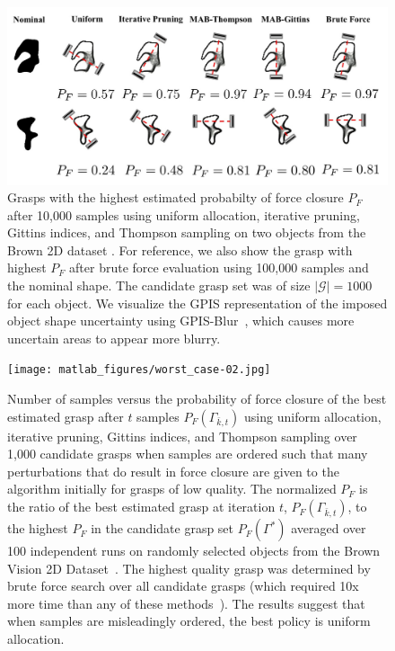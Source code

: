 \documentclass[10pt, conference]{ieeeconf}      %
\newcommand{\mG}{\mathcal{G}}
\begin{document}
\begin{figure}%
\label{fig:shape_examples}
    \centering
    \includegraphics[width=16.5cm]{figures/shapes.jpg}%
    \caption{Grasps with the highest estimated probabilty of force closure $P_F$ after 10,000 samples using uniform
    allocation, iterative pruning, Gittins indices, and Thompson sampling on two objects from the Brown 2D dataset
\cite{brown}. For reference, we also show the grasp with highest $P_F$ after brute force evaluation using 100,000
samples and the nominal shape. The candidate grasp set was of size $|\mG|=1000$ for each object. We visualize the GPIS
representation of the imposed object shape uncertainty using GPIS-Blur~\cite{mahler2015gp}, which causes more uncertain areas to appear more blurry.}%
    \label{fig:shape_samples}%
\end{figure}

\begin{figure}[ht!]
\centering
\texttt{[image: matlab\_figures/worst\_case-02.jpg]}
\caption{ \footnotesize 
	Number of samples versus the probability of force closure of the best estimated grasp after $t$ samples $P_F(\Gamma_{\bar{k}, t})$ using uniform allocation, iterative pruning, Gittins indices, and Thompson sampling over 1,000 candidate grasps when samples are ordered such that many perturbations that do result in force closure are given to the algorithm initially for grasps of low quality.
	The normalized $P_F$ is the ratio of the best estimated grasp at iteration $t$, $P_F(\Gamma_{\bar{k}, t})$, to the highest $P_F$ in the candidate grasp set $P_F(\Gamma^*)$ averaged over 100 independent runs on randomly selected objects from the Brown Vision 2D Dataset~\cite{brown}.
 	The highest quality grasp was determined by brute force search over all candidate grasps (which required 10x  more time than any of these methods~\cite{kehoe2012toward}).
 	The results suggest that when samples are misleadingly ordered, the best policy is uniform allocation.}
\vspace*{-10pt}
\label{fig:worst_case}
\end{figure}
\end{document}
